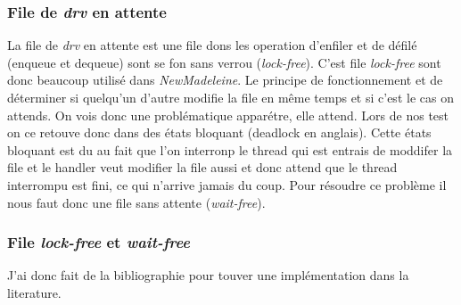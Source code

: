 \subsubsection{File de \emph{drv} en attente}

La file de \emph{drv} en attente est une file dons les operation d'enfiler et de défilé (enqueue et dequeue) sont se fon sans verrou (\emph{lock-free}).
C'est file \emph{lock-free} sont donc beaucoup utilisé dans \emph{NewMadeleine}.
Le principe de fonctionnement et de déterminer si quelqu'un d'autre modifie la file en même temps et si c'est le cas on attends.
On vois donc une problématique apparétre, elle attend.
Lors de nos test on ce retouve donc dans des états bloquant (deadlock en anglais).
Cette états bloquant est du au fait que l'on interronp le thread qui est entrais de moddifer la file et
le handler veut modifier la file aussi et donc attend que le thread interrompu est fini, ce qui n'arrive jamais du coup.
Pour résoudre ce problème il nous faut donc une file sans attente (\emph{wait-free}).

\subsubsection{File \emph{lock-free} et \emph{wait-free}}

J'ai donc fait de la bibliographie pour touver une implémentation dans la literature.

